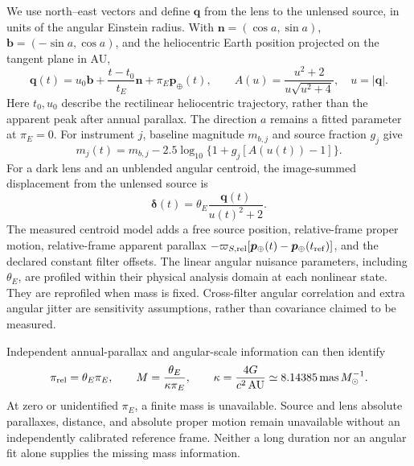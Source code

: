 We use north--east vectors and define $\boldsymbol q$ from the lens to the
unlensed source, in units of the angular Einstein radius. With
$\boldsymbol n=(\cos a,\sin a)$, $\boldsymbol b=(-\sin a,\cos a)$, and the
heliocentric Earth position projected on the tangent plane in AU,
\begin{equation}
 \boldsymbol q(t)=u_0\boldsymbol b+
 \frac{t-t_0}{t_E}\boldsymbol n+\pi_E\boldsymbol p_\oplus(t),\qquad
 A(u)=\frac{u^2+2}{u\sqrt{u^2+4}},\quad u=|\boldsymbol q|.
 \label{eq:joint-native-trajectory}
\end{equation}
Here $t_0,u_0$ describe the rectilinear heliocentric trajectory, rather than the
apparent peak after annual parallax. The direction $a$ remains a fitted parameter
at $\pi_E=0$. For instrument $j$, baseline magnitude $m_{b,j}$ and source fraction
$g_j$ give
\begin{equation}
 m_j(t)=m_{b,j}-2.5\log_{10}\{1+g_j[A(u(t))-1]\}.
\end{equation}
For a dark lens and an unblended angular centroid, the image-summed displacement
from the unlensed source is \cite{DominikSahu2000}
\begin{equation}
 \boldsymbol\delta(t)=\theta_E\frac{\boldsymbol q(t)}{u(t)^2+2}.
\end{equation}
The measured centroid model adds a free source position, relative-frame proper
motion, relative-frame apparent parallax
$-\varpi_{S,\mathrm{rel}}[\boldsymbol p_\oplus(t)-\boldsymbol p_\oplus(t_{\rm ref})]$,
and the declared constant filter offsets. The linear angular nuisance parameters,
including $\theta_E$, are profiled within their physical analysis domain at each
nonlinear state. They are reprofiled when mass is fixed. Cross-filter angular
correlation and extra angular jitter are sensitivity assumptions, rather than
covariance claimed to be measured.

Independent annual-parallax and angular-scale information can then identify
\begin{equation}
 \pi_{\rm rel}=\theta_E\pi_E,\qquad
 M=\frac{\theta_E}{\kappa\pi_E},\qquad
 \kappa=\frac{4G}{c^2\,\mathrm{AU}}
       \simeq8.14385\,\mathrm{mas}\,M_\odot^{-1}.
 \label{eq:joint-native-mass}
\end{equation}
At zero or unidentified $\pi_E$, a finite mass is unavailable. Source and lens
absolute parallaxes, distance, and absolute proper motion remain unavailable
without an independently calibrated reference frame. Neither a long duration
nor an angular fit alone supplies the missing mass information.

